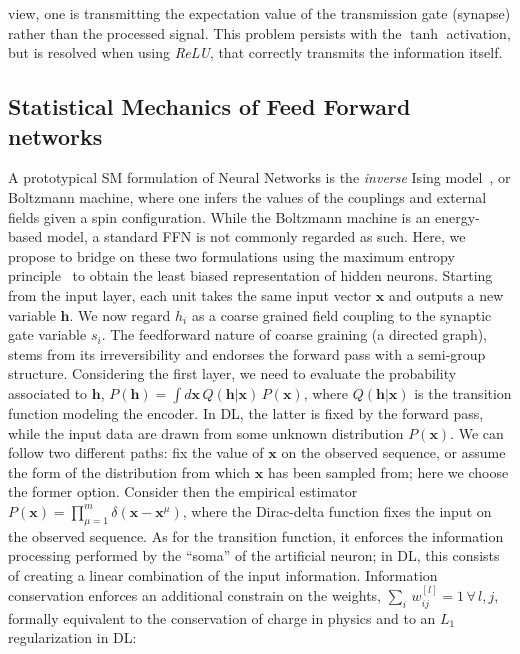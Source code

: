\documentclass{article}
\begin{document}
view, one is transmitting the expectation value of the transmission gate (synapse) rather than the processed signal. This problem persists with the $\tanh$ activation, but is resolved when using {\it ReLU}, that correctly transmits the information itself.

\subsection{Statistical Mechanics of Feed Forward networks}

A prototypical SM formulation of Neural Networks is the {\it inverse} Ising model~\cite{zecchina}, or Boltzmann machine, where one infers the values of the couplings and external fields given a spin configuration.  While the Boltzmann machine is an energy-based model, a standard FFN is not commonly regarded as such. Here, we propose to bridge on these two formulations using the maximum entropy principle~\cite{zecchina, roberto, mckay, jaynes} to obtain the least biased representation of hidden neurons. Starting from the input layer, each unit takes the same input vector $\mathbf{x}$ and outputs a new variable $\mathbf{h}$. We now regard $h_i$ as a coarse grained field coupling to the synaptic gate variable $s_i$. The feedforward nature of coarse graining (a directed graph), stems from its irreversibility and endorses the forward pass with a semi-group structure. Considering the first layer, we need to evaluate the probability associated to  $\mathbf{h}$, $P(\mathbf{h}) =  \int d \mathbf{x} \, Q(\mathbf{h} | \mathbf{x} ) \, P(\mathbf{x})$, where  $Q(\mathbf{h} | \mathbf{x} )$ is the transition function modeling the encoder. In DL, the latter is fixed by the forward pass, while the input data are drawn from some unknown distribution $P(\mathbf{x})$. We can follow two different paths: fix the value of $\mathbf{x}$ on the observed sequence, or assume the form of the distribution from which $\mathbf{x}$ has been sampled from; here we choose the former option. Consider then the empirical estimator $P(\mathbf{x}) =  \prod_{\mu=1}^m  \delta( \mathbf{x} - \mathbf{x}^{\mu} )$, where the Dirac-delta function  fixes the input on the observed sequence. As for the transition function, it enforces the information processing performed by the ``soma'' of the artificial neuron; in DL, this consists of creating a linear combination of the input information. Information conservation enforces an additional constrain on the weights, $\sum_i \, w_{ij}^{[l]} =1 \, \forall \, l,j$, formally equivalent to the conservation of charge in physics and to an $L_1$ regularization in DL:
\end{document}
